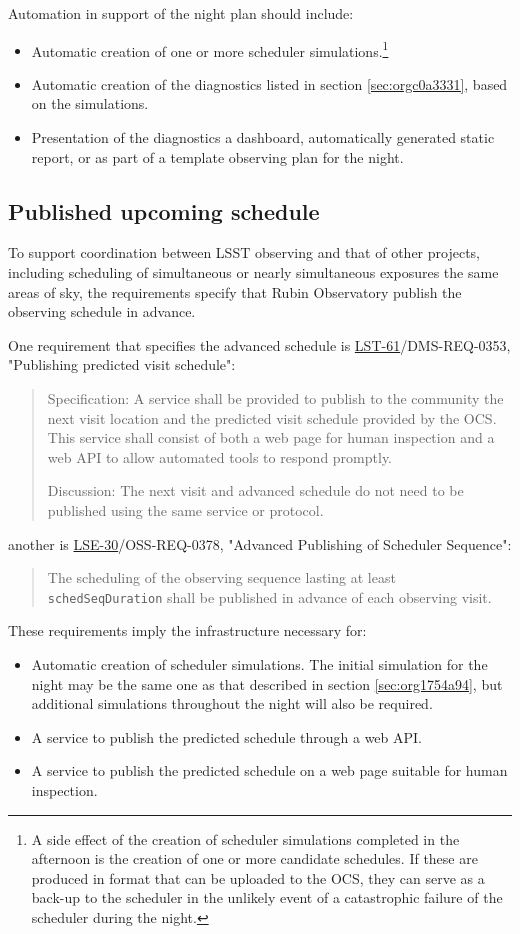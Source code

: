 Automation in support of the night plan should include:
\begin{itemize}
\item Automatic creation of one or more scheduler simulations.\footnote{A side effect of the creation of scheduler simulations completed in the afternoon is the creation of one or more candidate schedules. If these are produced in format that can be uploaded to the OCS, they can serve as a back-up to the scheduler in the unlikely event of a catastrophic failure of the scheduler during the night.}
\item Automatic creation of the diagnostics listed in section \ref{sec:orgc0a3331}, based on the simulations.
\item Presentation of the diagnostics a dashboard, automatically generated static report, or as part of a template observing plan for the night.
\end{itemize}

\subsection{Published upcoming schedule}
\label{sec:orgae5ac96}
To support coordination between LSST observing and that of other projects, including scheduling of simultaneous or nearly simultaneous exposures the same areas of sky, the requirements specify that Rubin Observatory publish the observing schedule in advance.

One requirement that specifies the advanced schedule is \href{https://ls.st/lse-61}{LST-61}/DMS-REQ-0353, "Publishing predicted visit schedule":
\begin{quote}
Specification: A service shall be provided to publish to the community the next visit location and the predicted visit schedule provided by the OCS. This service shall consist of both a web page for human inspection and a web API to allow automated tools to respond promptly.

Discussion: The next visit and advanced schedule do not need to be published using the same service or protocol.
\end{quote}
another is \href{https://ls.st/lse-30}{LSE-30}/OSS-REQ-0378, "Advanced Publishing of Scheduler Sequence":
\begin{quote}
The scheduling of the observing sequence lasting at least \texttt{schedSeqDuration} shall be published in advance of each observing visit.
\end{quote}

These requirements imply the infrastructure necessary for:
\begin{itemize}
\item Automatic creation of scheduler simulations. The initial simulation for the night may be the same one as that described in section \ref{sec:org1754a94}, but additional simulations throughout the night will also be required.
\item A service to publish the predicted schedule through a web API.
\item A service to publish the predicted schedule on a web page suitable for human inspection.
\end{itemize}


